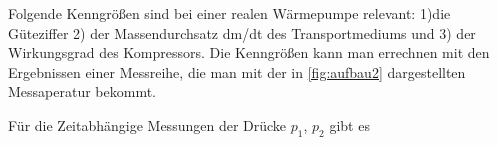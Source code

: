 Folgende Kenngrößen sind bei einer realen Wärmepumpe relevant: 1)die Güteziffer
2) der Massendurchsatz dm/dt des Transportmediums und 3) der Wirkungsgrad des Kompressors. Die Kenngrößen kann man errechnen mit den 
Ergebnissen einer Messreihe, die man mit der in \ref{fig:aufbau2} dargestellten Messaperatur bekommt.

Für die Zeitabhängige Messungen der Drücke $p_1$, $p_2$ gibt es 